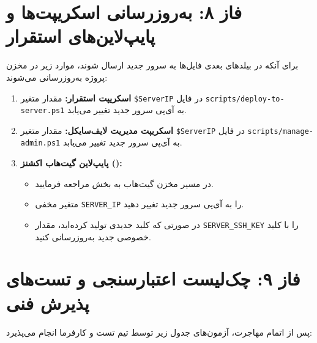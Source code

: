 \documentclass[11pt,a4paper]{article}
\begin{document}
\section{فاز ۸: به‌روزرسانی اسکریپت‌ها و پایپ‌لاین‌های استقرار}
برای آنکه در بیلدهای بعدی فایل‌ها به سرور جدید ارسال شوند، موارد زیر در مخزن پروژه به‌روزرسانی می‌شوند:

\begin{enumerate}
    \item \textbf{اسکریپت استقرار:} مقدار متغیر \verb|$ServerIP| در فایل \verb|scripts/deploy-to-server.ps1| به آی‌پی سرور جدید تغییر می‌یابد.
    \item \textbf{اسکریپت مدیریت لایف‌سایکل:} مقدار متغیر \verb|$ServerIP| در فایل \verb|scripts/manage-admin.ps1| به آی‌پی سرور جدید تغییر می‌یابد.
    \item \textbf{پایپ‌لاین گیت‌هاب اکشنز ():}
    \begin{itemize}
        \item در مسیر مخزن گیت‌هاب به بخش  مراجعه فرمایید.
        \item متغیر مخفی \verb|SERVER_IP| را به آی‌پی سرور جدید تغییر دهید.
        \item در صورتی که کلید  جدیدی تولید کرده‌اید، مقدار \verb|SERVER_SSH_KEY| را با کلید خصوصی جدید به‌روزرسانی کنید.
    \end{itemize}
\end{enumerate}

\section{فاز ۹: چک‌لیست اعتبارسنجی و تست‌های پذیرش فنی}
پس از اتمام مهاجرت، آزمون‌های جدول زیر توسط تیم تست و کارفرما انجام می‌پذیرد:
\end{document}
